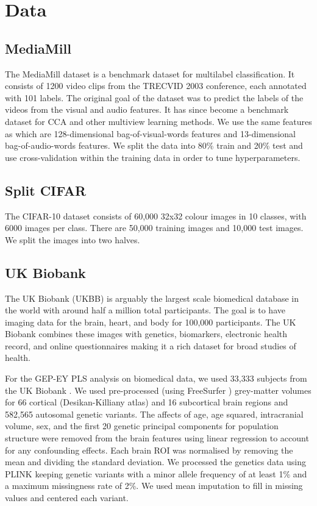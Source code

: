 \section{Data}
\subsection{MediaMill}
The MediaMill dataset \cite{feng2004context} is a benchmark dataset for multilabel classification. It consists of 1200 video clips from the TRECVID 2003 conference, each annotated with 101 labels. The original goal of the dataset was to predict the labels of the videos from the visual and audio features. It has since become a benchmark dataset for CCA and other multiview learning methods. We use the same features as \cite{gemp2022generalized} which are 128-dimensional bag-of-visual-words features and 13-dimensional bag-of-audio-words features. We split the data into 80\% train and 20\% test and use cross-validation within the training data in order to tune hyperparameters.

\subsection{Split CIFAR}
The CIFAR-10 dataset \cite{krizhevsky2009learning} consists of 60,000 32x32 colour images in 10 classes, with 6000 images per class. There are 50,000 training images and 10,000 test images. We split the images into two halves.

\subsection{UK Biobank}
The UK Biobank (UKBB) is arguably the largest scale biomedical database in the world with around half a million total participants. The goal is to have imaging data for the brain, heart, and body for 100,000 participants. The UK Biobank combines these images with genetics, biomarkers, electronic health record, and online questionnaires making it a rich dataset for broad studies of health.

For the GEP-EY PLS analysis on biomedical data, we used 33,333 subjects from the UK Biobank \cite{sudlow2015uk}. We used pre-processed (using FreeSurfer \cite{Fischl2012}) grey-matter volumes for 66 cortical (Desikan-Killiany atlas) and 16 subcortical brain regions and 582,565 autosomal genetic variants. The affects of age, age squared, intracranial volume, sex, and the first 20 genetic principal components for population structure were removed from the brain features using linear regression to account for any confounding effects. Each brain ROI was normalised by removing the mean and dividing the standard deviation. We processed the genetics data using PLINK \cite{Purcell2007} keeping genetic variants with a minor allele frequency of at least 1\%  and a maximum missingness rate of 2\%. We used mean imputation to fill in missing values and centered each variant.

